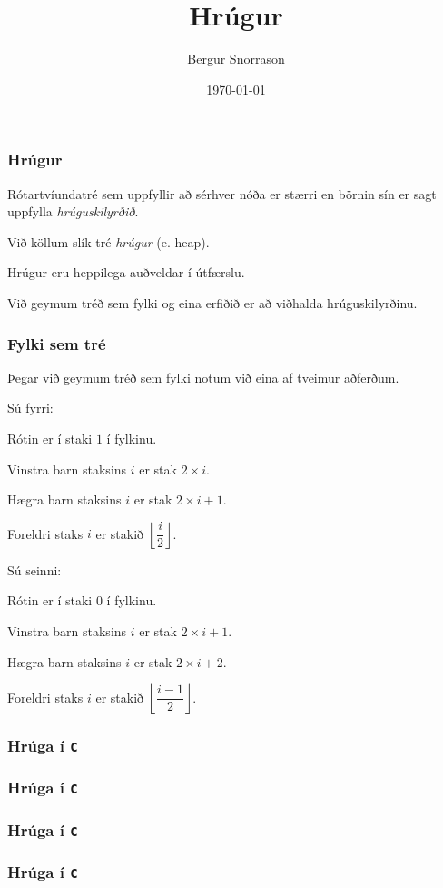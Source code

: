 \title{Hrúgur}
\author{Bergur Snorrason}
\date{\today}



\frame{\titlepage}

{
	\frametitle{Hrúgur}
	{
		\item<1-> Rótartvíundatré sem uppfyllir að sérhver nóða er stærri en börnin sín er sagt uppfylla \emph{hrúguskilyrðið}.
		\item<2-> Við köllum slík tré \emph{hrúgur} (e. heap).
		\item<3-> Hrúgur eru heppilega auðveldar í útfærslu.
		\item<4-> Við geymum tréð sem fylki og eina erfiðið er að viðhalda hrúguskilyrðinu.
	}
}

{
	\frametitle{Fylki sem tré}
	{
		\item<1-> Þegar við geymum tréð sem fylki notum við eina af tveimur aðferðum.
		\item<2-> Sú fyrri:
		{
			\item<3-> Rótin er í staki $1$ í fylkinu.
			\item<4-> Vinstra barn staksins $i$ er stak $2\times i$.
			\item<5-> Hægra barn staksins $i$ er stak $2\times i + 1$.
			\item<6-> Foreldri staks $i$ er stakið $\left \lfloor \dfrac{i}{2} \right \rfloor$.
		}
		\item<7-> Sú seinni:
		{
			\item<8-> Rótin er í staki $0$ í fylkinu.
			\item<9-> Vinstra barn staksins $i$ er stak $2\times i + 1$.
			\item<10-> Hægra barn staksins $i$ er stak $2\times i + 2$.
			\item<11-> Foreldri staks $i$ er stakið $\left \lfloor \dfrac{i - 1}{2} \right \rfloor$.
		}
	}
}

{
	\frametitle{Hrúga í \texttt{C}}
}

{
	\frametitle{Hrúga í \texttt{C}}
}

{
	\frametitle{Hrúga í \texttt{C}}
}

{
	\frametitle{Hrúga í \texttt{C}}
}


